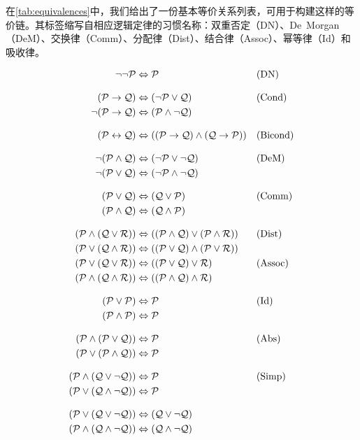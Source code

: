 在\cref{tab:equivalences}中，我们给出了一份基本等价关系列表，可用于构建这样的等价链。其标签缩写自相应逻辑定律的习惯名称：双重否定（DN）、De~Morgan（DeM）、交换律（Comm）、分配律（Dist）、结合律（Assoc）、幂等律（Id）和吸收律。

\begin{table}
	\begin{align*}
\lnot\lnot \mathcal{P} & \Leftrightarrow \mathcal{P} && \text{(DN)}\\[2ex]
(\mathcal{P} \rightarrow \mathcal{Q}) & \Leftrightarrow (\lnot \mathcal{P} \lor \mathcal{Q})
&& \text{(Cond)}\\
\lnot(\mathcal{P} \rightarrow \mathcal{Q}) & \Leftrightarrow (\mathcal{P} \land \lnot\mathcal{Q}) \\[2ex]
(\mathcal{P} \leftrightarrow \mathcal{Q}) & \Leftrightarrow ((\mathcal{P} \rightarrow \mathcal{Q}) \land  (\mathcal{Q} \rightarrow \mathcal{P}))
&& \text{(Bicond)}\\[2ex]
\lnot(\mathcal{P} \land \mathcal{Q}) & \Leftrightarrow (\lnot\mathcal{P} \lor \lnot\mathcal{Q})
&& \text{(DeM)}\\
\lnot(\mathcal{P} \lor \mathcal{Q}) & \Leftrightarrow (\lnot\mathcal{P} \land \lnot\mathcal{Q}) \\[2ex]
(\mathcal{P} \lor \mathcal{Q}) & \Leftrightarrow (\mathcal{Q} \lor \mathcal{P}) & &\text{(Comm)}\\
(\mathcal{P} \land \mathcal{Q}) & \Leftrightarrow (\mathcal{Q} \land \mathcal{P})\\[2ex]
(\mathcal{P} \land (\mathcal{Q} \lor \mathcal{R})) & \Leftrightarrow ((\mathcal{P} \land \mathcal{Q}) \lor (\mathcal{P} \land \mathcal{R}))
&& \text{(Dist)}\\
(\mathcal{P} \lor (\mathcal{Q} \land \mathcal{R})) & \Leftrightarrow ((\mathcal{P} \lor \mathcal{Q}) \land (\mathcal{P} \lor \mathcal{R}))\\
(\mathcal{P} \lor (\mathcal{Q} \lor \mathcal{R})) & \Leftrightarrow ((\mathcal{P} \lor \mathcal{Q}) \lor \mathcal{R}) & &\text{(Assoc)}\\
(\mathcal{P} \land (\mathcal{Q} \land \mathcal{R})) & \Leftrightarrow ((\mathcal{P} \land \mathcal{Q}) \land \mathcal{R})\\[2ex]
(\mathcal{P} \lor \mathcal{P}) & \Leftrightarrow \mathcal{P} && \text{(Id)}\\
(\mathcal{P} \land \mathcal{P}) & \Leftrightarrow \mathcal{P}\\[2ex]
(\mathcal{P} \land (\mathcal{P} \lor \mathcal{Q})) & \Leftrightarrow \mathcal{P}&& \text{(Abs)}\\
(\mathcal{P} \lor (\mathcal{P} \land \mathcal{Q})) & \Leftrightarrow \mathcal{P}\\[2ex]
(\mathcal{P} \land (\mathcal{Q} \lor \lnot\mathcal{Q})) & \Leftrightarrow \mathcal{P}  && \text{(Simp)}\\
(\mathcal{P} \lor (\mathcal{Q} \land \lnot\mathcal{Q})) & \Leftrightarrow \mathcal{P}\\[2ex]
(\mathcal{P} \lor (\mathcal{Q} \lor \lnot\mathcal{Q})) & \Leftrightarrow (\mathcal{Q} \lor \lnot\mathcal{Q}) \\
(\mathcal{P} \land (\mathcal{Q} \land \lnot\mathcal{Q})) & \Leftrightarrow (\mathcal{Q} \land \lnot\mathcal{Q})
\end{align*}
\caption{基本等价关系}
\label{tab:equivalences}
\end{table}

